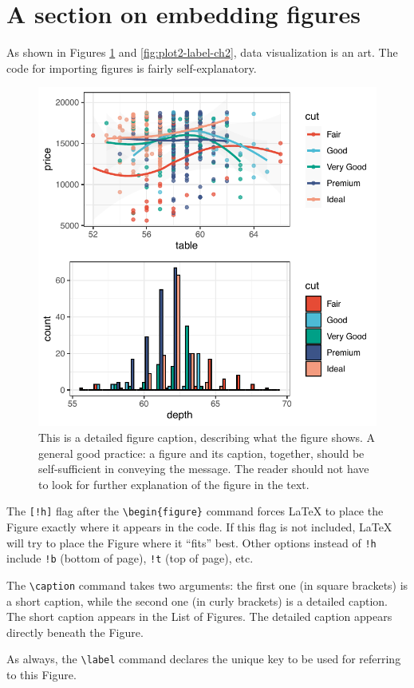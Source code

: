 \section{A section on embedding figures}\label{figures-sec-ch2}
As shown in Figures \ref{fig:plot-label-ch2} and \ref{fig:plot2-label-ch2}, data visualization is an art. The code for importing figures is fairly self-explanatory.

\begin{figure}[!h]
\centering
\includegraphics[width=0.7\linewidth]{"ch02/Some_Plot"}
\caption[A figure]{This is a detailed figure caption, describing what the figure shows. A general good practice: a figure and its caption, together, should be self-sufficient in conveying the message. The reader should not have to look for further explanation of the figure in the text.}
\label{fig:plot-label-ch2}
\end{figure}

The \verb|[!h]| flag after the \verb|\begin{figure}| command forces \LaTeX{} to place the Figure exactly where it appears in the code. If this flag is not included, \LaTeX{} will try to place the Figure where it ``fits'' best. Other options instead of \verb|!h| include \verb|!b| (bottom of page), \verb|!t| (top of page), etc.

The \verb|\caption| command takes two arguments: the first one (in square brackets) is a short caption, while the second one (in curly brackets) is a detailed caption. The short caption appears in the List of Figures. The detailed caption appears directly beneath the Figure.

As always, the \verb|\label| command declares the unique key to be used for referring to this Figure.

